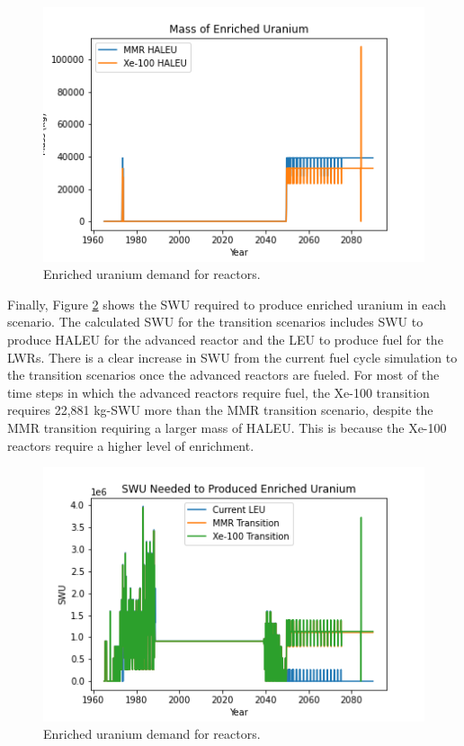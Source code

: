 \begin{figure}[ht]
    \centering
    \includegraphics[scale=0.5]{figures/enrichedU_advancedrx.png}
    \caption{Enriched uranium demand for reactors.}
    \label{fig:enriched_u}
\end{figure}

Finally, Figure \ref{fig:swu} shows the \gls{SWU} required to 
produce enriched uranium in each scenario. The calculated 
\gls{SWU} for the transition scenarios includes \gls{SWU} to 
produce \gls{HALEU} for the advanced reactor and the \gls{LEU}
to produce fuel for the \gls{LWR}s. There is a clear increase 
in \gls{SWU} from the current fuel cycle simulation to the 
transition scenarios once the advanced reactors are fueled. 
For most of the time steps in which the advanced reactors 
require fuel, the Xe-100 transition requires 22,881 kg-SWU 
more than the MMR transition scenario, despite the MMR 
transition requiring a larger mass of \gls{HALEU}. This is 
because the Xe-100 reactors require a higher level of 
enrichment.  

\begin{figure}[ht]
    \centering
    \includegraphics[scale=0.5]{figures/swu_all.png}
    \caption{Enriched uranium demand for reactors.}
    \label{fig:swu}
\end{figure}